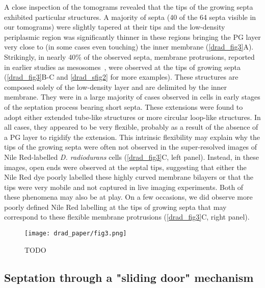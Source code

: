 A close inspection of the tomograms revealed that the tips of the growing septa exhibited particular structures.
A majority of septa (40 of the 64 septa visible in our tomograms) were slightly tapered at their tips and the low-density periplasmic region was significantly thinner in these regions bringing the PG layer very close to (in some cases even touching) the inner membrane (\autoref{drad_fig3}A).
Strikingly, in nearly 40\% of the observed septa, membrane protrusions, reported in earlier studies as mesosomes~\cite{thornleyFineStructureMicrococcus1965,sleytrStudyFreezeetchingFine1973}, were observed at the tips of growing septa (\autoref{drad_fig3}B-C and \autoref{drad_sfig2} for more examples).
These structures are composed solely of the low-density layer and are delimited by the inner membrane.
They were in a large majority of cases observed in cells in early stages of the septation process bearing short septa.
These extensions were found to adopt either extended tube-like structures or more circular loop-like structures.
In all cases, they appeared to be very flexible, probably as a result of the absence of a PG layer to rigidify the extension.
This intrinsic flexibility may explain why the tips of the growing septa were often not observed in the super-resolved images of Nile Red-labelled \textit{D. radiodurans} cells (\autoref{drad_fig3}C, left panel).
Instead, in these images, open ends were observed at the septal tips, suggesting that either the Nile Red dye poorly labelled these highly curved membrane bilayers or that the tips were very mobile and not captured in live imaging experiments.
Both of these phenomena may also be at play.
On a few occasions, we did observe more poorly defined Nile Red labelling at the tips of growing septa that may correspond to these flexible membrane protrusions (\autoref{drad_fig3}C, right panel).

\begin{figure}[ht]
    \centering
    \texttt{[image: drad\_paper/fig3.png]}
    \caption{TODO}
    \label{drad_fig3}
\end{figure}

\FloatBarrier

\subsection{Septation through a "sliding door" mechanism}

